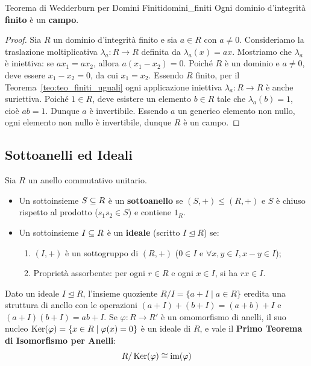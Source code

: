 \begin{teorema}{Teorema di Wedderburn per Domini Finiti}{domini_finiti}
Ogni dominio d'integrità \textbf{finito} è un \textbf{campo}.
\end{teorema}
\begin{proof}
Sia $R$ un dominio d'integrità finito e sia $a \in R$ con $a \neq 0$.
Consideriamo la traslazione moltiplicativa $\lambda_a: R \to R$ definita da $\lambda_a(x) = ax$.
Mostriamo che $\lambda_a$ è iniettiva: se $ax_1 = ax_2$, allora $a(x_1 - x_2) = 0$. Poiché $R$ è un dominio e $a \neq 0$, deve essere $x_1 - x_2 = 0$, da cui $x_1 = x_2$.
Essendo $R$ finito, per il Teorema~\ref{teo:teo_finiti_uguali} ogni applicazione iniettiva $\lambda_a: R \to R$ è anche suriettiva.
Poiché $1 \in R$, deve esistere un elemento $b \in R$ tale che $\lambda_a(b) = 1$, cioè $ab = 1$. Dunque $a$ è invertibile.
Essendo $a$ un generico elemento non nullo, ogni elemento non nullo è invertibile, dunque $R$ è un campo.
\end{proof}

\subsection{Sottoanelli ed Ideali}
Sia $R$ un anello commutativo unitario.
\begin{itemize}
    \item Un sottoinsieme $S \subseteq R$ è un \textbf{sottoanello} se $(S, +) \le (R, +)$ e $S$ è chiuso rispetto al prodotto ($s_1 s_2 \in S$) e contiene $1_R$.
    \item Un sottoinsieme $I \subseteq R$ è un \textbf{ideale} (scritto $I \trianglelefteq R$) se:
    \begin{enumerate}
        \item $(I, +)$ è un sottogruppo di $(R, +)$ ($0 \in I$ e $\forall x, y \in I, x - y \in I$);
        \item Proprietà assorbente: per ogni $r \in R$ e ogni $x \in I$, si ha $rx \in I$.
    \end{enumerate}
\end{itemize}

Dato un ideale $I \trianglelefteq R$, l'insieme quoziente $R/I = \{a + I \mid a \in R\}$ eredita una struttura di anello con le operazioni $(a + I) + (b + I) = (a + b) + I$ e $(a + I)(b + I) = ab + I$.
Se $\varphi: R \to R'$ è un omomorfismo di anelli, il suo nucleo $\operatorname{Ker}(\varphi) = \{x \in R \mid \varphi(x) = 0\}$ è un ideale di $R$, e vale il \textbf{Primo Teorema di Isomorfismo per Anelli}:
\[
    R/\operatorname{Ker}(\varphi) \cong \operatorname{im}(\varphi)
\]
